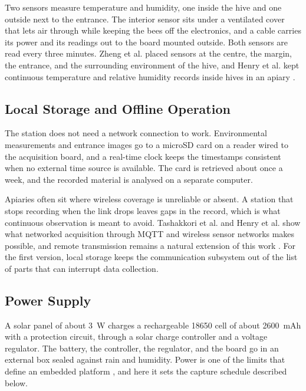 \documentclass[english,hidelinks]{sbrt}
\begin{document}
Two sensors measure temperature and humidity, one inside the hive and one outside next to the entrance. The interior sensor sits under a ventilated cover that lets air through while keeping the bees off the electronics, and a cable carries its power and its readings out to the board mounted outside. Both sensors are read every three minutes. Zheng et al. placed sensors at the centre, the margin, the entrance, and the surrounding environment of the hive, and Henry et al. kept continuous temperature and relative humidity records inside hives in an apiary \cite{zheng2024intelligent,henry2019precision}.

\subsection{Local Storage and Offline Operation}

The station does not need a network connection to work. Environmental measurements and entrance images go to a microSD card on a reader wired to the acquisition board, and a real-time clock keeps the timestamps consistent when no external time source is available. The card is retrieved about once a week, and the recorded material is analysed on a separate computer.

Apiaries often sit where wireless coverage is unreliable or absent. A station that stops recording when the link drops leaves gaps in the record, which is what continuous observation is meant to avoid. Tashakkori et al. and Henry et al. show what networked acquisition through MQTT and wireless sensor networks makes possible, and remote transmission remains a natural extension of this work \cite{tashakkori2021beemon,henry2019precision}. For the first version, local storage keeps the communication subsystem out of the list of parts that can interrupt data collection.

\subsection{Power Supply}

A solar panel of about 3~W charges a rechargeable 18650 cell of about 2600~mAh with a protection circuit, through a solar charge controller and a voltage regulator. The battery, the controller, the regulator, and the board go in an external box sealed against rain and humidity. Power is one of the limits that define an embedded platform \cite{demicco2020embedded}, and here it sets the capture schedule described below.
\end{document}
